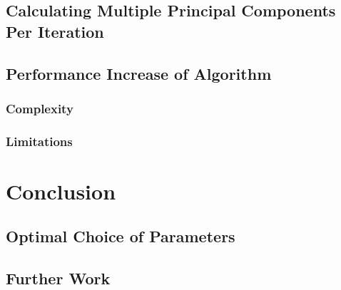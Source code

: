 \documentclass[11pt,a4paper]{article}
\begin{document}
\subsection{Calculating Multiple Principal Components Per Iteration}

\subsection{Performance Increase of Algorithm}

\subsubsection{Complexity}

\subsubsection{Limitations}


\clearpage
\section{Conclusion}
\subsection{Optimal Choice of Parameters}
\subsection{Further Work}

\clearpage
\end{document}
